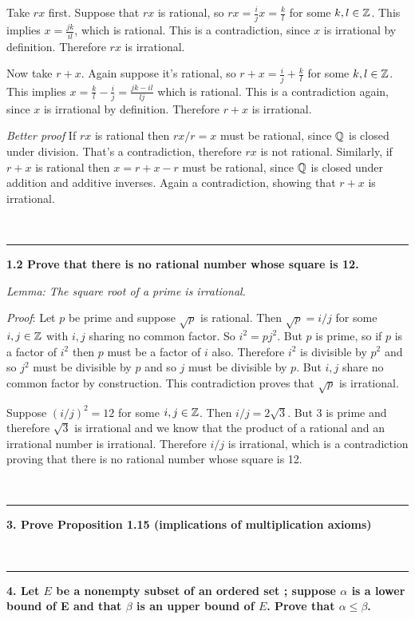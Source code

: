 Take $rx$ first. Suppose that $rx$ is rational, so $rx = \frac{i}{j}x =
\frac{k}{l}$ for some $k, l \in \mathbb{Z}$. This implies $x = \frac{jk}{il}$, which is
rational. This is a contradiction, since $x$ is irrational by
definition. Therefore $rx$ is irrational.

Now take $r + x$. Again suppose it's rational, so $r + x = \frac{i}{j} +
\frac{k}{l}$ for some $k, l \in \mathbb{Z}$. This implies $x = \frac{k}{l} -
\frac{i}{j} = \frac{jk - il}{lj}$ which is rational. This is a contradiction
again, since $x$ is irrational by definition. Therefore $r + x$ is irrational.

\textit{Better proof} If $rx$ is rational then $rx/r = x$ must be rational, since $\mathbb{Q}$
is closed under division. That's a contradiction, therefore $rx$ is not
rational. Similarly, if $r + x$ is rational then $x = r + x - r$ must be
rational, since $\mathbb{Q}$ is closed under addition and additive inverses. Again a
contradiction, showing that $r+x$ is irrational.

~\\\hrule
\textbf{1.2 Prove that there is no rational number whose square is 12.}

\textit{Lemma: The square root of a prime is irrational.}

\textit{Proof}: Let $p$ be prime and suppose $\sqrt{p}$ is rational. Then $\sqrt{p} =
i/j$ for some $i, j \in \mathbb{Z}$ with $i,j$ sharing no common factor. So $i^2 =
pj^2$. But $p$ is prime, so if $p$ is a factor of $i^2$ then $p$ must be a
factor of $i$ also. Therefore $i^2$ is divisible by $p^2$ and so $j^2$ must be
divisible by $p$ and so $j$ must be divisible by $p$. But $i,j$ share no common
factor by construction. This contradiction proves that $\sqrt{p}$ is
irrational.

Suppose $(i/j)^2 = 12$ for some $i,j \in \mathbb{Z}$. Then $i/j = 2\sqrt{3}$. But $3$
is prime and therefore $\sqrt{3}$ is irrational and we know that the product of
a rational and an irrational number is irrational. Therefore $i/j$ is
irrational, which is a contradiction proving that there is no rational number
whose square is 12.


~\\\hrule
\textbf{3. Prove Proposition 1.15 (implications of multiplication axioms)}

~\\\hrule
\textbf{4. Let $E$ be a nonempty subset of an ordered set ; suppose $\alpha$ is a
lower bound of E and that $\beta$ is an upper bound of $E$. Prove that $\alpha
\leq \beta$.}

